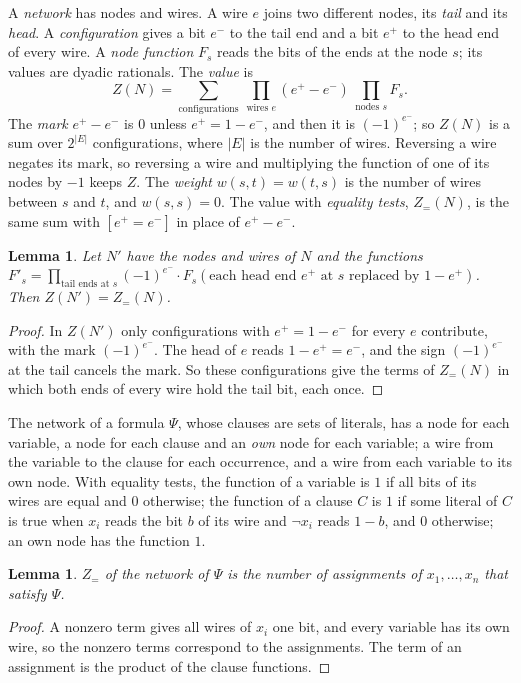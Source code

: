 \documentclass[10pt]{article}
\newtheorem{lemma}[theorem]{Lemma}
\begin{document}
A \emph{network} has nodes and wires. A wire $e$ joins two different nodes, its \emph{tail} and its \emph{head}. A \emph{configuration} gives a bit $e^-$ to the tail end and a bit $e^+$ to the head end of every wire. A \emph{node function} $F_s$ reads the bits of the ends at the node $s$; its values are dyadic rationals. The \emph{value} is
\[
Z(N)=\sum_{\text{configurations}}\ \prod_{\text{wires }e}(e^+-e^-)\ \prod_{\text{nodes }s}F_s .
\]
The \emph{mark} $e^+-e^-$ is $0$ unless $e^+=1-e^-$, and then it is $(-1)^{e^-}$; so $Z(N)$ is a sum over $2^{|E|}$ configurations, where $|E|$ is the number of wires. Reversing a wire negates its mark, so reversing a wire and multiplying the function of one of its nodes by $-1$ keeps $Z$. The \emph{weight} $w(s,t)=w(t,s)$ is the number of wires between $s$ and $t$, and $w(s,s)=0$. The value with \emph{equality tests}, $Z_=(N)$, is the same sum with $[e^+=e^-]$ in place of $e^+-e^-$.

\begin{lemma}\label{lem:flip}
Let $N'$ have the nodes and wires of $N$ and the functions $F'_s=\prod_{\text{tail ends at }s}(-1)^{e^-}\cdot F_s(\text{each head end $e^+$ at $s$ replaced by $1-e^+$})$. Then $Z(N')=Z_=(N)$.
\end{lemma}
\begin{proof}
In $Z(N')$ only configurations with $e^+=1-e^-$ for every $e$ contribute, with the mark $(-1)^{e^-}$. The head of $e$ reads $1-e^+=e^-$, and the sign $(-1)^{e^-}$ at the tail cancels the mark. So these configurations give the terms of $Z_=(N)$ in which both ends of every wire hold the tail bit, each once.
\end{proof}

The network of a formula $\Psi$, whose clauses are sets of literals, has a node for each variable, a node for each clause and an \emph{own} node for each variable; a wire from the variable to the clause for each occurrence, and a wire from each variable to its own node. With equality tests, the function of a variable is $1$ if all bits of its wires are equal and $0$ otherwise; the function of a clause $C$ is $1$ if some literal of $C$ is true when $x_i$ reads the bit $b$ of its wire and $\neg x_i$ reads $1-b$, and $0$ otherwise; an own node has the function $1$.

\begin{lemma}\label{lem:formula}
$Z_=$ of the network of $\Psi$ is the number of assignments of $x_1,\dots,x_n$ that satisfy $\Psi$.
\end{lemma}
\begin{proof}
A nonzero term gives all wires of $x_i$ one bit, and every variable has its own wire, so the nonzero terms correspond to the assignments. The term of an assignment is the product of the clause functions.
\end{proof}
\end{document}
